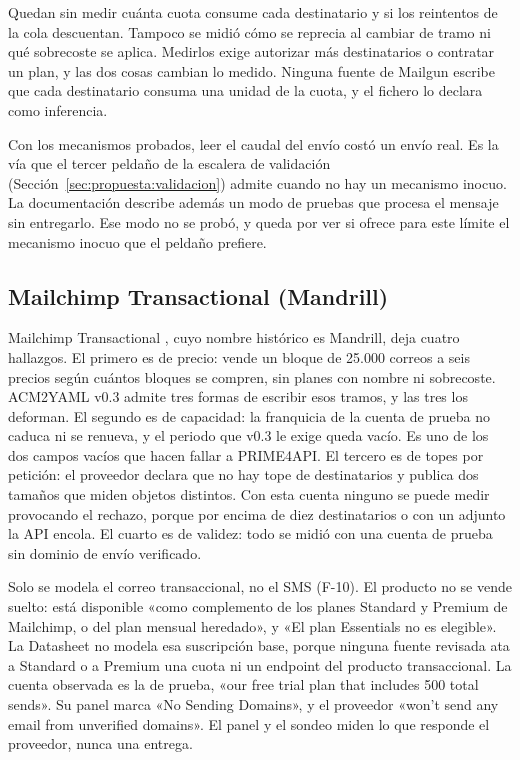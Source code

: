 Quedan sin medir cuánta cuota consume cada destinatario y si los reintentos de
la cola descuentan. Tampoco se midió cómo se reprecia al cambiar de tramo ni qué
sobrecoste se aplica. Medirlos exige autorizar más
destinatarios o contratar un plan, y las dos cosas cambian lo
medido. Ninguna fuente de Mailgun escribe que cada destinatario consuma una
unidad de la cuota, y el fichero lo declara como inferencia.

Con los mecanismos probados, leer el caudal del envío costó un envío real. Es la vía que el tercer peldaño de la escalera de validación (Sección~\ref{sec:propuesta:validacion}) admite cuando no hay un mecanismo inocuo. La documentación describe además un modo de pruebas que procesa
el mensaje sin entregarlo. Ese modo no se probó, y queda por ver si ofrece para
este límite el mecanismo inocuo que el peldaño prefiere.

\subsection{Mailchimp Transactional (Mandrill)}
\label{subsec:hallazgos:mailchimp}

Mailchimp Transactional \citep{mailchimppricing,mailchimpdocs}, cuyo nombre
histórico es Mandrill, deja cuatro hallazgos. El primero es de precio: vende un
bloque de 25.000 correos a seis precios según cuántos bloques se compren, sin planes
con nombre ni sobrecoste. ACM2YAML v0.3 admite tres formas de escribir esos tramos,
y las tres los deforman. El segundo es de capacidad: la franquicia de la cuenta de
prueba no caduca ni se renueva, y el periodo que v0.3 le exige queda vacío. Es uno de
los dos campos vacíos que hacen fallar a PRIME4API.
El tercero es de topes por petición: el proveedor declara que no hay tope de
destinatarios y publica dos tamaños que miden objetos distintos. Con esta cuenta
ninguno se puede medir provocando el rechazo, porque por encima de diez destinatarios
o con un adjunto la API encola. El cuarto es de validez:
todo se midió con una cuenta de prueba sin dominio de envío verificado.

Solo se modela el correo transaccional, no el SMS (F-10). El producto no se vende
suelto: está disponible «como complemento de los planes Standard y Premium de
Mailchimp, o del plan mensual heredado», y «El plan Essentials no es elegible». La
Datasheet no modela esa suscripción base, porque ninguna fuente revisada ata a
Standard o a Premium una cuota ni un endpoint del producto transaccional. La cuenta
observada es la de prueba, «our free trial plan that includes 500 total sends». Su panel marca «No Sending Domains», y el
proveedor «won't send any email from unverified domains». El panel y el sondeo miden
lo que responde el proveedor, nunca una entrega.


